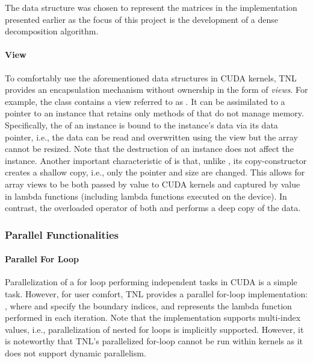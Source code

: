 The  data structure was chosen to represent the matrices in the implementation presented earlier as the focus of this project is the development of a dense decomposition algorithm.

\paragraph{View} To comfortably use the aforementioned data structures in CUDA kernels, TNL provides an encapsulation mechanism without ownership in the form of \textit{views}.
For example, the  class contains a view referred to as .
It can be assimilated to a pointer to an  instance that retains only methods of  that do not manage memory.
Specifically, the  of an  instance is bound to the  instance's data via its data pointer, i.e., the data can be read and overwritten using the view but the array cannot be resized.
Note that the destruction of an  instance does not affect the  instance.
Another important characteristic of  is that, unlike , its copy-constructor creates a shallow copy, i.e., only the pointer and size are changed.
This allows for array views to be both passed by value to CUDA kernels and captured by value in lambda functions (including lambda functions executed on the device).
In contrast, the overloaded operator  of both  and  performs a deep copy of the data.

\subsubsection{Parallel Functionalities}\label{Subsection:implementation->libraries-used->TNL->parallel-functionalities}

\paragraph{Parallel For Loop} Parallelization of a for loop performing independent tasks in CUDA is a simple task.
However, for user comfort, TNL provides a parallel for-loop implementation: , where  and  specify the boundary indices, and  represents the lambda function performed in each iteration.
Note that the implementation supports multi-index values, i.e., parallelization of nested for loops is implicitly supported.
However, it is noteworthy that TNL's parallelized for-loop cannot be run within kernels as it does not support dynamic parallelism.

